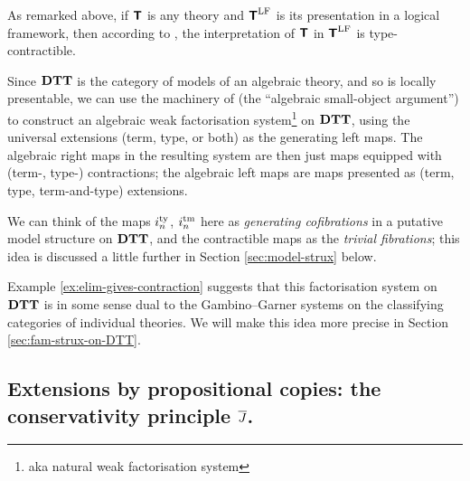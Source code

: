 \documentclass{amsart}
\begin{document}
\begin{example} 
As remarked above, if $\textbf{\textsf{T}}$ is any theory and $\textbf{\textsf{T}}^\mathrm{LF}$ is its presentation in a logical framework, then according to \cite[]{hofmann:syntax-and-semantics}, the interpretation of $\textbf{\textsf{T}}$ in $\textbf{\textsf{T}}^\mathrm{LF}$ is type-contractible. 
\end{example}

\begin{para} Since $\mathbf{DTT}$ is the category of models of an algebraic theory, and so is locally presentable, we can use the machinery of \cite{garner:understanding} (the ``algebraic small-object argument'') to construct an algebraic weak factorisation system\footnote{aka natural weak factorisation system} on $\mathbf{DTT}$, using the universal extensions (term, type, or both) as the generating left maps.  The algebraic right maps in the resulting system are then just maps equipped with (term-, type-) contractions; the algebraic left maps are maps presented as (term, type, term-and-type) extensions.

We can think of the maps $i^{\textrm{ty}}_n$, $i^{\textrm{tm}}_n$ here as \emph{generating cofibrations} in a putative model structure on $\mathbf{DTT}$, and the contractible maps as the \emph{trivial fibrations}; this idea is discussed a little further in Section \ref{sec:model-strux} below.

Example \ref{ex:elim-gives-contraction} suggests that this factorisation system on $\mathbf{DTT}$ is in some sense dual to the Gambino--Garner systems on the classifying categories of individual theories.  We will make this idea more precise in Section \ref{sec:fam-strux-on-DTT}.
\end{para}






\subsection{Extensions by propositional copies: the conservativity principle $\overline{J}$.}
\end{document}
